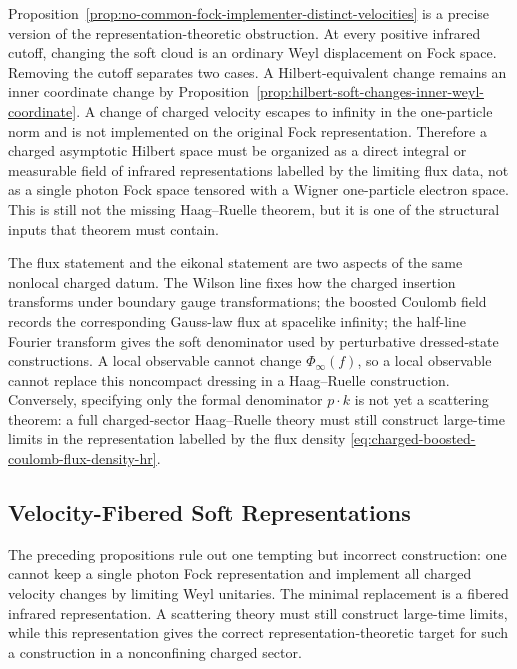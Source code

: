 Proposition~\ref{prop:no-common-fock-implementer-distinct-velocities} is a
precise version of the representation-theoretic obstruction.  At every
positive infrared cutoff, changing the soft cloud is an ordinary Weyl
displacement on Fock space.  Removing the cutoff separates two cases.  A
Hilbert-equivalent change remains an inner coordinate change by
Proposition~\ref{prop:hilbert-soft-changes-inner-weyl-coordinate}.  A change
of charged velocity escapes to infinity in the one-particle norm and is not
implemented on the original Fock representation.  Therefore a charged
asymptotic Hilbert space must be organized as a direct integral or measurable
field of infrared representations labelled by the limiting flux data, not as
a single photon Fock space tensored with a Wigner one-particle electron
space.  This is still not the missing Haag--Ruelle theorem, but it is one of
the structural inputs that theorem must contain.

The flux statement and the eikonal statement are two aspects of the same
nonlocal charged datum.  The Wilson line fixes how the charged insertion
transforms under boundary gauge transformations; the boosted Coulomb field
records the corresponding Gauss-law flux at spacelike infinity; the
half-line Fourier transform gives the soft denominator used by perturbative
dressed-state constructions.  A local observable cannot change
\(\Phi_\infty(f)\), so a local observable cannot replace this noncompact
dressing in a Haag--Ruelle construction.  Conversely, specifying only the
formal denominator \(p\cdot k\) is not yet a scattering theorem: a full
charged-sector Haag--Ruelle theory must still construct large-time limits in
the representation labelled by the flux density
\eqref{eq:charged-boosted-coulomb-flux-density-hr}.

\subsection{Velocity-Fibered Soft Representations}

The preceding propositions rule out one tempting but incorrect construction:
one cannot keep a single photon Fock representation and implement all charged
velocity changes by limiting Weyl unitaries.  The minimal replacement is a
fibered infrared representation.  A scattering theory must still construct
large-time limits, while this representation gives the correct
representation-theoretic target for such a construction in a
nonconfining charged sector.

